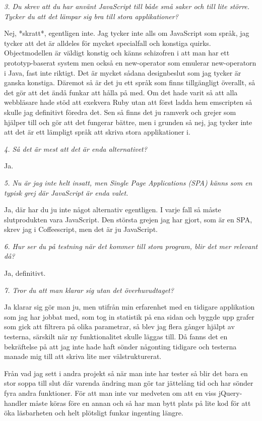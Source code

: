 \documentclass[11pt]{article}
\begin{document}
\emph{3. Du skrev att du har använt JavaScript till både små saker och till lite större. Tycker du att det lämpar sig bra till stora applikationer?}

Nej, *skratt*, egentligen inte. Jag tycker inte alls om JavaScript som språk, jag tycker att det är alldeles för mycket specialfall och konstiga quirks. Objectmodellen är väldigt konstig och känns schizofren i att man har ett prototyp-baserat system men också en new-operator som emulerar new-operatorn i Java, fast inte riktigt. Det är mycket sådana designbeslut som jag tycker är ganska konstiga. Däremot så är det ju ett språk som finns tillgängligt överallt, så det gör att det ändå funkar att hålla på med. Om det hade varit så att alla webbläsare hade stöd att exekvera Ruby utan att först ladda hem emscripten så skulle jag definitivt föredra det. Sen så finns det ju ramverk och grejer som hjälper till och gör att det fungerar bättre, men i grunden så nej, jag tycker inte att det är ett lämpligt språk att skriva stora applikationer i.

\emph{4. Så det är mest att det är enda alternativet?}

Ja.

\emph{5. Nu är jag inte helt insatt, men Single Page Applications (SPA) känns som en typisk grej där JavaScript är enda valet.}

Ja, där har du ju inte något alternativ egentligen. I varje fall så måste slutprodukten vara JavaScript. Den största grejen jag har gjort, som är en SPA, skrev jag i Coffeescript, men det är ju JavaScript.

\emph{6. Hur ser du på testning när det kommer till stora program, blir det mer relevant då?}

Ja, definitivt.

\emph{7. Tror du att man klarar sig utan det överhuvudtaget?}

Ja klarar sig gör man ju, men utifrån min erfarenhet med en tidigare applikation som jag har jobbat med, som tog in statistik på ena sidan och byggde upp grafer som gick att filtrera på olika parametrar, så blev jag flera gånger hjälpt av testerna, särskilt när ny funktionalitet skulle läggas till. Då fanns det en bekräftelse på att jag inte hade haft sönder någonting tidigare och testerna manade mig till att skriva lite mer välstrukturerat.

Från vad jag sett i andra projekt så när man inte har tester så blir det bara en stor soppa till slut där varenda ändring man gör tar jättelång tid och har sönder fyra andra funktioner. För att man inte var medveten om att en viss jQuery-handler måste köras före en annan och så har man bytt plats på lite kod för att öka läsbarheten och helt plötsligt funkar ingenting längre.
\end{document}
